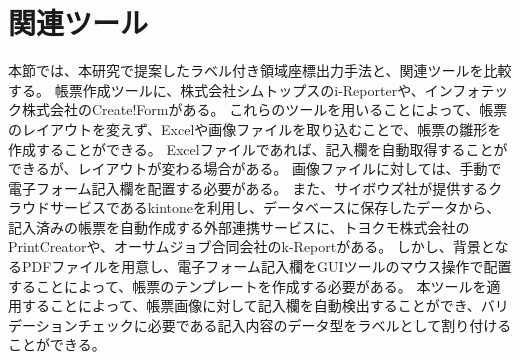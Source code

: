 







\section{関連ツール}\label{sec:relation_tools}
本節では、本研究で提案したラベル付き領域座標出力手法と、関連ツールを比較する。
帳票作成ツールに、株式会社シムトップスのi-Reporter\cite{i-Reporter}や、インフォテック株式会社のCreate!Form\cite{Create!Form}がある。
これらのツールを用いることによって、帳票のレイアウトを変えず、Excelや画像ファイルを取り込むことで、帳票の雛形を作成することができる。
Excelファイルであれば、記入欄を自動取得することができるが、レイアウトが変わる場合がある。
画像ファイルに対しては、手動で電子フォーム記入欄を配置する必要がある。
また、サイボウズ社が提供するクラウドサービスであるkintone\cite{kintone}を利用し、データベースに保存したデータから、記入済みの帳票を自動作成する外部連携サービスに、トヨクモ株式会社のPrintCreator\cite{PrintCreator}や、オーサムジョブ合同会社のk-Report\cite{k-Report}がある。
しかし、背景となるPDFファイルを用意し、電子フォーム記入欄をGUIツールのマウス操作で配置することによって、帳票のテンプレートを作成する必要がある。
本ツールを適用することによって、帳票画像に対して記入欄を自動検出することができ、バリデーションチェックに必要である記入内容のデータ型をラベルとして割り付けることができる。

